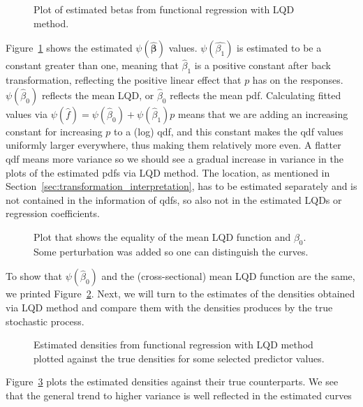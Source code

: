 \begin{figure}[h!]
    \centering
    \resizebox{1\textwidth}{!}{}
    \caption[Estimated betas in LQD functional regression]{Plot of estimated betas from
    functional regression with LQD method.}
    \label{fig:betas}
\end{figure}
Figure~\ref{fig:betas} shows the estimated $\psi(\hat{\boldsymbol{\beta}})$ values. $\psi(\hat{\beta_1})$
is estimated to be a constant greater than one, meaning that $\hat{\beta}_1$ is a positive
constant after back transformation, reflecting the positive linear effect that $p$ has
on the responses. $\psi(\hat{\beta}_0)$ reflects the mean LQD, or $\hat{\beta}_0$ reflects
the mean pdf. Calculating fitted values via $\psi(\hat{f}) = \psi(\hat{\beta}_0) + \psi(\hat{\beta}_1) p$
means that we are adding an increasing constant for increasing $p$ to a (log) qdf, and
this constant makes the qdf values uniformly larger everywhere, thus making them relatively
more even. A flatter qdf means more variance so we should see a gradual increase in
variance  in the plots of the estimated pdfs via LQD method. The location, as mentioned
in Section~\ref{sec:transformation_interpretation}, has to be estimated separately and is not
contained in the information of qdfs, so also not in the estimated LQDs or regression
coefficients.
\begin{figure}[h!]
    \centering
    \resizebox{1\textwidth}{!}{}
    \caption[Equality of mean LQD function and $\psi(\hat{\beta}_0)$]{Plot that shows the equality
    of the mean LQD function and $\beta_0$. Some perturbation was added so one can
    distinguish the curves.}
    \label{fig:beta0vsmean}
\end{figure}
To show that $\psi(\hat{\beta}_0)$ and the (cross-sectional) mean LQD function are the
same, we printed Figure~\ref{fig:beta0vsmean}. Next, we will turn to the estimates of
the densities obtained via LQD method and compare them with the densities produces by
the true stochastic process.
\begin{figure}[h!]
    \centering
    \resizebox{1\textwidth}{!}{}
    \caption[Comparison: estimated vs. true densities --- LQD]{Estimated densities from
    functional regression with LQD method plotted against the true densities for some
    selected predictor values.}
    \label{fig:func_est_vs_true}
\end{figure}
Figure~\ref{fig:func_est_vs_true} plots the estimated densities against their true
counterparts. We see that the general trend to higher variance is well reflected in the
estimated curves

